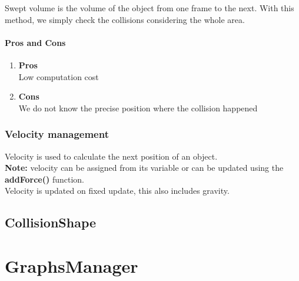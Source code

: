 \documentclass{article}
\begin{document}
    Swept volume is the volume of the object from one frame to the next.
    With this method, we simply check the collisions considering the whole area.

    \paragraph{Pros and Cons}
    \begin{enumerate}
        \item \textbf{Pros}\\
        Low computation cost
        \item \textbf{Cons}\\
        We do not know the precise position where the collision happened
    \end{enumerate}

    \subsubsection{Velocity management}

    Velocity is used to calculate the next position of an object.\\
    \textbf{Note:} velocity can be assigned from its variable or can be updated using the \textbf{addForce()} function.\\
    Velocity is updated on fixed update, this also includes gravity.

    \newpage

    \subsection{CollisionShape} \label{subsec:collisionshape}
    \section{GraphsManager}\label{sec:graphsmanager}
\end{document}
